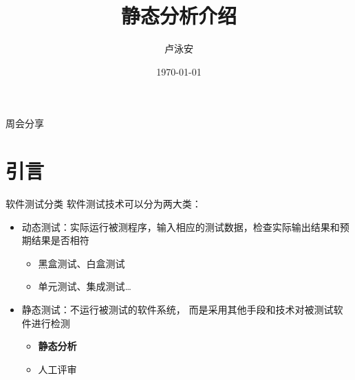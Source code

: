 \documentclass{beamer}
\title{静态分析介绍}
\author{卢泳安}
\date{\today}
\begin{document}
\linespread{1.2}

\begin{frame}{周会分享}
    \maketitle
\end{frame}


\section{引言}

\begin{frame}{软件测试分类}
    软件测试技术可以分为两大类：

    \begin{itemize}
        \item 动态测试：{\kaishu 实际运行被测程序，输入相应的测试数据，检查实际输出结果和预期结果是否相符}
        \begin{itemize}
            \item 黑盒测试、白盒测试
            \item 单元测试、集成测试\ldots
        \end{itemize}
        \item 静态测试：{\kaishu 不运行被测试的软件系统， 而是采用其他手段和技术对被测试软件进行检测}
        \begin{itemize}
            \item \textbf{静态分析}
            \item 人工评审 %
        \end{itemize}
    \end{itemize}
\end{frame}
\end{document}
